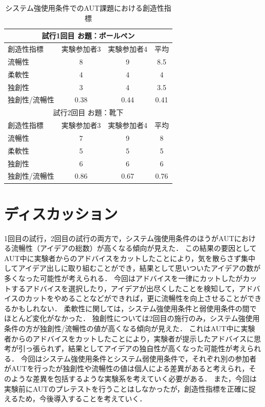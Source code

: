 \documentclass[a4paper]{jarticle}
\begin{document}
\begin{table}[h]
    \caption{システム強使用条件でのAUT課題における創造性指標}
    \label{table:strong}
    \centering
    \begin{tabular}{lccc}
      \hline
      \multicolumn{4}{c}{試行1回目 お題：ボールペン} \\
      \hline
      創造性指標  & 実験参加者3  &  実験参加者4  &  平均 \\
      \hline
      流暢性  & 8  & 9 & 8.5 \\
      柔軟性  & 4   & 4  & 4 \\
      独創性  & 3  & 4 & 3.5 \\
      独創性/流暢性  & 0.38 & 0.44 & 0.41 \\
      \hline
      \multicolumn{4}{c}{試行2回目 お題：靴下} \\
      \hline
      創造性指標  & 実験参加者3  &  実験参加者4  &  平均 \\
      \hline
      流暢性  & 7  & 9 & 8 \\
      柔軟性  & 5   & 5  & 5 \\
      独創性  & 6  & 6 & 6 \\
      独創性/流暢性  & 0.86 & 0.67 & 0.76 \\
      \hline
    \end{tabular}
\end{table}

\section{ディスカッション}
1回目の試行，2回目の試行の両方で，システム強使用条件のほうがAUTにおける流暢性（アイデアの総数）が高くなる傾向が見えた．
この結果の要因としてAUT中に実験者からのアドバイスをカットしたことにより，気を散らさず集中してアイデア出しに取り組むことができ，結果として思いついたアイデアの数が多くなった可能性が考えられる．
今回はアドバイスを一律にカットしたがカットするアドバイスを選択したり，アイデアが出尽くしたことを検知して，アドバイスのカットをやめることなどができれば，更に流暢性を向上させることができるかもしれない．
柔軟性に関しては，システム強使用条件と弱使用条件の間でほとんど変化がなかった．
独創性については2回目の施行のみ，システム強使用条件の方が独創性/流暢性の値が高くなる傾向が見えた．
これはAUT中に実験者からのアドバイスをカットしたことにより，実験者が提示したアドバイスに思考が引っ張られず，結果としてアイデアの独自性が高くなった可能性が考えられる．
今回はシステム強使用条件とシステム弱使用条件で，それぞれ別の参加者がAUTを行ったが独創性や流暢性の値は個人による差異があると考えられ，そのような差異を包括するような実験系を考えていく必要がある．
また，今回は実験前にAUTのプレテストを行うことはしなかったが，創造性指標を正確に捉えるため，今後導入することを考えていく．
\end{document}
